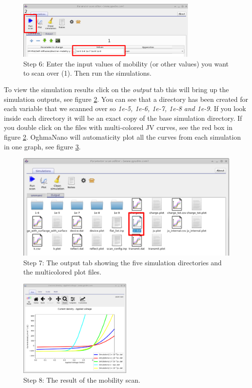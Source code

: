 \begin{figure}[H]
\centering
\includegraphics[width=0.8\textwidth]{./images/param_scan_inputvalues.png}
\caption{Step 6: Enter the input values of mobility (or other values) you want to scan over (1). Then run the simulations.}
\label{fig:runscan}
\end{figure}

To view the simulation results click on the \emph{output} tab this will bring up the simulation outputs, see figure \ref{fig:scanoutput}. You can see that a directory has been created for each variable that we scanned over so \emph{1e-5, 1e-6, 1e-7, 1e-8 and 1e-9}.  If you look inside each directory it will be an exact copy of the base simulation directory.  If you double click on the files with multi-colored JV curves, see the red box in figure \ref{fig:scanoutput}. OghmaNano will automaticity plot all the curves from each simulation in one graph, see figure \ref{fig:scanjv}.

\begin{figure}[H]
\centering
\includegraphics[width=\textwidth]{./images/param_scan_output.png}
\caption{Step 7: The output tab showing the five simulation directories and the multicolored plot files.}
\label{fig:scanoutput}
\end{figure}

\begin{figure}[H]
\centering
\includegraphics[width=0.5\textwidth]{./images/param_scan_jv.png}
\caption{Step 8: The result of the mobility scan.}
\label{fig:scanjv}
\end{figure}

